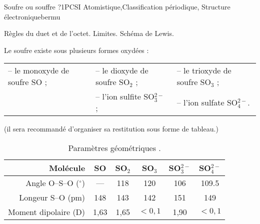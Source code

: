 
\begin{exercise}{Soufre ou souffre ?}{1}{PCSI}
{Atomistique,Classification périodique, Structure électronique}{bermu}


\begin{questions}
    \questioncours Règles du duet et de l'octet. Limites. Schéma de Lewis.
    
    
    \question Le soufre existe sous plusieurs formes oxydées : \\
    \begin{tabular}{lll}
        -- le monoxyde de soufre SO ; & -- le dioxyde de soufre SO$_2$ ; & -- le trioxyde de soufre SO$_3$ ; \\
       & -- l'ion sulfite SO$_3^{2-}$ ; & -- l'ion sulfate SO$_4^{2-}$.
    \end{tabular}
    
    (il sera recommandé d'organiser sa restitution sous forme de tableau.)
    
    \begin{table}[H]
    \centering
    \begin{tabularx}{.7\linewidth}{r|CCCCC}
        Molécule & SO & SO$_2$ & SO$_3$ & SO$_3^{2-}$ & SO$_4^{2-}$ \\ \hline\hline
        Angle O--S--O ($^\circ$) & --- & 118 & 120 & 106 & 109.5 \\ 
        Longeur S--O (pm) & 148 & 143 & 142 & 151 & 149  \\
       Moment dipolaire (D) & 1,63 & 1,65 & $< 0,1$ & 1,90 & $< 0,1$ \\ \hline
    \end{tabularx}
    \caption{Paramètres géométriques .}
\end{table}

\end{questions}

\end{exercise}